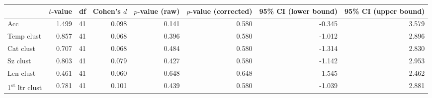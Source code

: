 \begin{tabular}{lrrrrrrr}
\toprule
 & $t$-value & df & Cohen's $d$ & $p$-value (raw) & $p$-value (corrected) & 95\% CI (lower bound) & 95\% CI (upper bound) \\
\midrule
 Acc & 1.499 & 41 & 0.098 & 0.141 & 0.580 & -0.345 & 3.579 \\
 Temp clust & 0.857 & 41 & 0.068 & 0.396 & 0.580 & -1.012 & 2.896 \\
 Cat clust & 0.707 & 41 & 0.068 & 0.484 & 0.580 & -1.314 & 2.830 \\
 Sz clust & 0.803 & 41 & 0.079 & 0.427 & 0.580 & -1.142 & 2.953 \\
 Len clust & 0.461 & 41 & 0.060 & 0.648 & 0.648 & -1.545 & 2.462 \\
 1\textsuperscript{st} ltr clust & 0.781 & 41 & 0.101 & 0.439 & 0.580 & -1.039 & 2.881 \\
\bottomrule
\end{tabular}